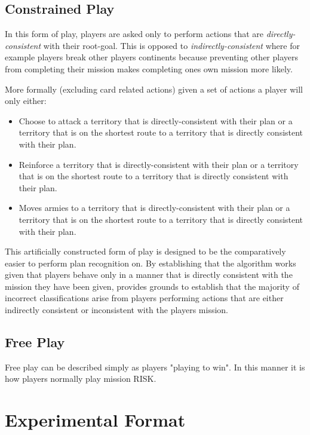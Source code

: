 \documentclass[parskip]{cs4rep}
\begin{document}
\subsection{Constrained Play}

In this form of play, players are asked only to perform actions that are \textit{directly-consistent} with their root-goal. This is opposed to \textit{indirectly-consistent} where for example players break other players continents because preventing other players from completing their mission makes completing ones own mission more likely.

More formally (excluding card related actions) given a set of actions a player will only either:

\begin{itemize}
\item
Choose to attack a territory that is directly-consistent with their plan or a territory that is on the shortest route to a territory that is directly consistent with their plan.
\item
Reinforce a territory that is directly-consistent with their plan or a territory that is on the shortest route to a territory that is directly consistent with their plan.
\item
Moves armies to a territory that is directly-consistent with their plan or a territory that is on the shortest route to a territory that is directly consistent with their plan.
\end{itemize}

This artificially constructed form of play is designed to be the comparatively easier to perform plan recognition on. By establishing that the algorithm works given that players behave only in a manner that is directly consistent with the mission they have been given, provides grounds to establish that the majority of incorrect classifications arise from players performing actions that are either indirectly consistent or inconsistent with the players mission.

\subsection{Free Play}

Free play can be described simply as players "playing to win". In this manner it is how players normally play mission RISK.

\section{Experimental Format}
\end{document}
